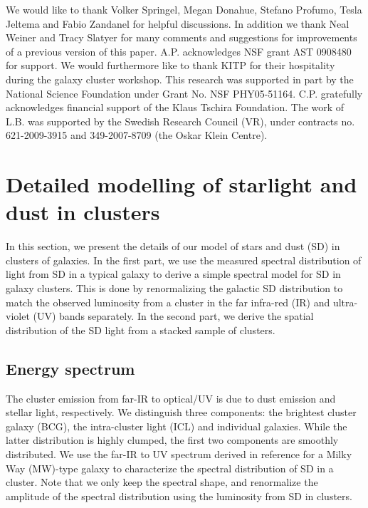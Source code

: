 \documentclass[10pt,aps,pra,reprint,amsmath,amsfonts,amssymb,showpacs,nofootinbib,floatfix]{revtex4-1}
\begin{document}


\smallskip We would like to thank Volker Springel, Megan Donahue,
Stefano Profumo, Tesla Jeltema and Fabio Zandanel for helpful
discussions.  In addition we thank Neal Weiner and Tracy Slatyer for
many comments and suggestions for improvements of a previous version
of this paper. A.P. acknowledges NSF grant AST 0908480 for support. We
would furthermore like to thank KITP for their hospitality during the
galaxy cluster workshop.  This research was supported in part by the
National Science Foundation under Grant No. NSF PHY05-51164.
C.P. gratefully acknowledges financial support of the Klaus Tschira
Foundation. The work of L.B. was supported by the Swedish Research
Council (VR), under contracts no. 621-2009-3915 and 349-2007-8709 (the
Oskar Klein Centre).


%


\vspace{-0.7cm}

%
%

\appendix

\section{Detailed modelling of starlight and dust in clusters}
\label{sect:SD}
In this section, we present the details of our model of stars and dust
(SD) in clusters of galaxies. In the first part, we use the measured
spectral distribution of light from SD in a typical galaxy to derive a
simple spectral model for SD in galaxy clusters. This is done by
renormalizing the galactic SD distribution to match the observed luminosity
from a cluster in the far infra-red (IR) and ultra-violet (UV) bands
separately. In the second part, we derive the spatial distribution of
the SD light from a stacked sample of clusters.

\subsection{Energy spectrum}
The cluster emission from far-IR to optical/UV is due to dust emission
and stellar light, respectively. We distinguish three components: the
brightest cluster galaxy (BCG), the intra-cluster light (ICL) and
individual galaxies. While the latter distribution is highly clumped,
the first two components are smoothly distributed.  We use the far-IR
to UV spectrum derived in reference \cite{2006ApJ...648L..29P} for a
Milky Way (MW)-type galaxy to characterize the spectral distribution
of SD in a cluster. Note that we only keep the spectral shape, and
renormalize the amplitude of the spectral distribution using the
luminosity from SD in clusters.
\end{document}
